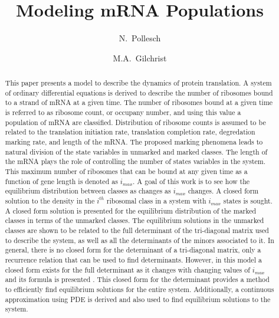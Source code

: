 \documentclass[review]{elsarticle}
\begin{document}
\title{Modeling mRNA Populations}
\author[utkm,curradd]{N.~Pollesch}
\author[utkeeb,nimbios]{M.A.~Gilchrist}
\address[utkm]{Department of Mathematics, University of Tennessee,  Knoxville, TN 37996-1320}
\address[curradd]{Department of ??, Environmental Protection Agency, Duluth MN XXXXX}
\address[utkeeb]{Department of Ecology and Evolutionary Biology, University of Tennessee, Knoxville, TN 37996-1610}
\address[nimbios]{National Institute for Mathematical and Biological Synthesis, University of Tennessee, Knoxville, TN 37996-3410}

\begin{abstract}
This paper presents a model to describe the dynamics of protein translation.  
A system of ordinary differential equations is derived to describe the number of ribosomes bound to a strand of mRNA at a given time.
The number of ribosomes bound at a given time is referred to as ribosome count, or occupany number, and using this value a population of mRNA are classified.  
Distribution of ribosome counts is assumed to be related to the translation initiation rate, translation completion rate, degredation marking rate, and length of the mRNA.
The proposed marking phenomena leads to natural division of the state variables in unmarked and marked classes.
The length of the mRNA plays the role of controlling the number of states variables in the system.  
This maximum number of ribosomes that can be bound at any given time as a function of gene length is denoted as $i_{max}$.
A goal of this work is to see how the equilibrium distribution between classes as changes as $i_{max}$ changes.
A closed form solution to the density in the $i^{th}$ ribosomal class in a system with $i_{max}$ states is sought.
A closed form solution is presented for the equilibrium distribution of the marked classes in terms of the unmarked classes.
The equilibrium solutions in the unmarked classes are shown to be related to the full determinant of the tri-diagonal matrix used to describe the system, as well as all the determinants of the minors associated to it.
In general, there is no closed form for the determinant of a tri-diagonal matrix, only a recurrence relation that can be used to find determinants.
However, in this model a closed form exists for the full determinant as it changes with changing values of $i_{max}$ and its formula is presented .
This closed form for the determinant provides a method to efficiently find equilibrium solutions for the entire system.
Additionally, a continuous approximation using PDE is derived and also used to find equilibrium solutions to the system.

\end{abstract}
\end{document}
